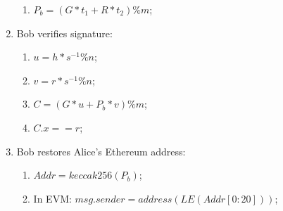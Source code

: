 \begin{algorithm}[H]
\begin{enumerate}
\begin{enumerate}
            \item $P_b = (G * t_1 + R * t_2) \% m$;
        \end{enumerate}
        \item Bob verifies signature: 
        \begin{enumerate}
            \item $u = h * s^{-1} \% n$;
            \item $v = r * s^{-1} \% n$;
            \item $C = (G * u + P_b * v) \% m$;
            \item $C.x == r$;
        \end{enumerate}
        \item Bob restores Alice's Ethereum address:
        \begin{enumerate}
            \item $Addr = keccak256(P_b)$;
            \item In EVM: $msg.sender = address(LE(Addr[0:20]))$;
        \end{enumerate}
    \end{enumerate}
\end{algorithm}

